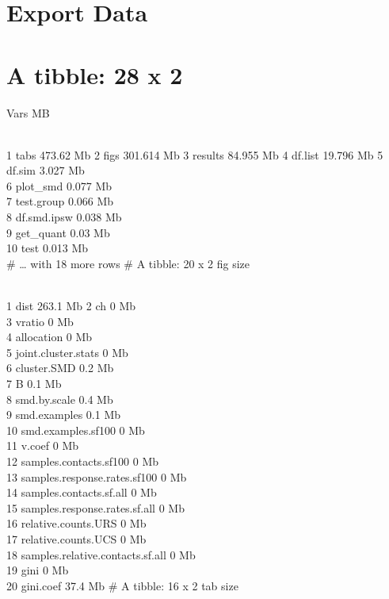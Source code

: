 \documentclass[
  man,floatsintext]{apa6}
\begin{document}
\hypertarget{export-data}{%
\section{Export Data}\label{export-data}}

\hypertarget{a-tibble-28-x-2}{%
\section{A tibble: 28 x 2}\label{a-tibble-28-x-2}}

Vars MB\\
\strut \\
1 tabs 473.62 Mb
2 figs 301.614 Mb
3 results 84.955 Mb
4 df.list 19.796 Mb
5 df.sim 3.027 Mb\\
6 plot\_smd 0.077 Mb\\
7 test.group 0.066 Mb\\
8 df.smd.ipsw 0.038 Mb\\
9 get\_quant 0.03 Mb\\
10 test 0.013 Mb\\
\# \ldots{} with 18 more rows
\# A tibble: 20 x 2
fig size\\
\strut \\
1 dist 263.1 Mb
2 ch 0 Mb\\
3 vratio 0 Mb\\
4 allocation 0 Mb\\
5 joint.cluster.stats 0 Mb\\
6 cluster.SMD 0.2 Mb\\
7 B 0.1 Mb\\
8 smd.by.scale 0.4 Mb\\
9 smd.examples 0.1 Mb\\
10 smd.examples.sf100 0 Mb\\
11 v.coef 0 Mb\\
12 samples.contacts.sf100 0 Mb\\
13 samples.response.rates.sf100 0 Mb\\
14 samples.contacts.sf.all 0 Mb\\
15 samples.response.rates.sf.all 0 Mb\\
16 relative.counts.URS 0 Mb\\
17 relative.counts.UCS 0 Mb\\
18 samples.relative.contacts.sf.all 0 Mb\\
19 gini 0 Mb\\
20 gini.coef 37.4 Mb
\# A tibble: 16 x 2
tab size\\
\strut \\
\end{document}
